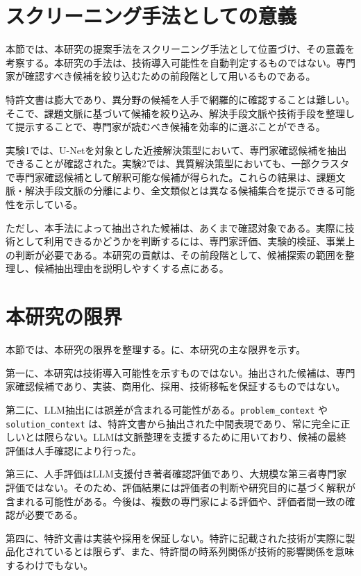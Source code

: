 \section{スクリーニング手法としての意義}

本節では、本研究の提案手法をスクリーニング手法として位置づけ、その意義を考察する。本研究の手法は、技術導入可能性を自動判定するものではない。専門家が確認すべき候補を絞り込むための前段階として用いるものである。

特許文書は膨大であり、異分野の候補を人手で網羅的に確認することは難しい。そこで、課題文脈に基づいて候補を絞り込み、解決手段文脈や技術手段を整理して提示することで、専門家が読むべき候補を効率的に選ぶことができる。

実験1では、U-Netを対象とした近接解決策型において、専門家確認候補を抽出できることが確認された。実験2では、異質解決策型においても、一部クラスタで専門家確認候補として解釈可能な候補が得られた。これらの結果は、課題文脈・解決手段文脈の分離により、全文類似とは異なる候補集合を提示できる可能性を示している。

ただし、本手法によって抽出された候補は、あくまで確認対象である。実際に技術として利用できるかどうかを判断するには、専門家評価、実験的検証、事業上の判断が必要である。本研究の貢献は、その前段階として、候補探索の範囲を整理し、候補抽出理由を説明しやすくする点にある。

\section{本研究の限界}




本節では、本研究の限界を整理する。に、本研究の主な限界を示す。

第一に、本研究は技術導入可能性を示すものではない。抽出された候補は、専門家確認候補であり、実装、商用化、採用、技術移転を保証するものではない。

第二に、LLM抽出には誤差が含まれる可能性がある。\texttt{problem\_context} や \texttt{solution\_context} は、特許文書から抽出された中間表現であり、常に完全に正しいとは限らない。LLMは文脈整理を支援するために用いており、候補の最終評価は人手確認により行った。

第三に、人手評価はLLM支援付き著者確認評価であり、大規模な第三者専門家評価ではない。そのため、評価結果には評価者の判断や研究目的に基づく解釈が含まれる可能性がある。今後は、複数の専門家による評価や、評価者間一致の確認が必要である。

第四に、特許文書は実装や採用を保証しない。特許に記載された技術が実際に製品化されているとは限らず、また、特許間の時系列関係が技術的影響関係を意味するわけでもない。

